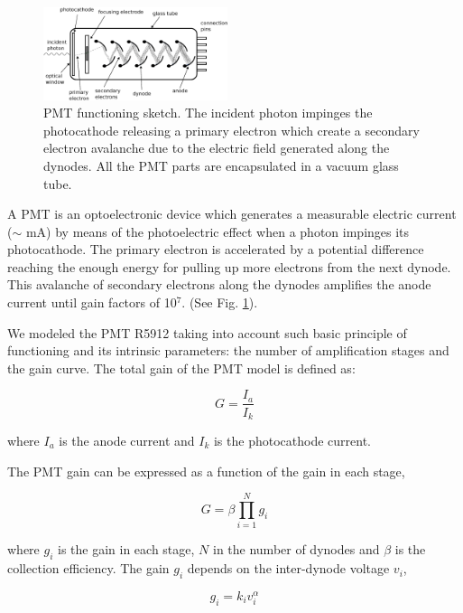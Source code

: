 \documentclass[letterpaper, 10 pt, conference]{ieeeconf}  %
\begin{document}
\begin{figure}[h!]
\begin{center}
\includegraphics[width=0.48\textwidth]{Figures/PMT.eps}
\caption{PMT functioning sketch. The incident photon impinges the photocathode releasing a primary electron which create a secondary electron avalanche due to the electric field generated along the dynodes. All the PMT parts are encapsulated in a vacuum glass tube.}
\label{PMT_sketch}
\end{center}
\end{figure}

A PMT is an optoelectronic device which generates a measurable electric current ($\sim$ mA) by means of the photoelectric effect when a photon impinges its photocathode. The primary electron is accelerated by a potential difference reaching the enough energy for pulling up more electrons from the next dynode. This avalanche of secondary electrons along the dynodes amplifies the anode current until gain factors of 10$^7$. (See Fig. \ref{PMT_sketch}).

We modeled the PMT R5912 taking into account such basic principle of functioning and its intrinsic parameters: the number of amplification stages and the gain curve. The total gain of the PMT model is defined as:

\begin{equation}
G = \frac{I_a}{I_k}
\end{equation}

where $I_a$ is the anode current and $I_k$ is the photocathode current.

The PMT gain can be expressed as a function of the gain in each stage,

\begin{equation}
G =  \beta \prod_{i=1}^{N}  g_i 
\end{equation}

where $g_i$ is the gain in each stage, $N$ in the number of dynodes and $\beta$ is the collection efficiency. The gain $g_i$ depends on the inter-dynode voltage $v_i$,

\begin{equation}
g_i = k_i v_i^\alpha
\end{equation}
\end{document}
